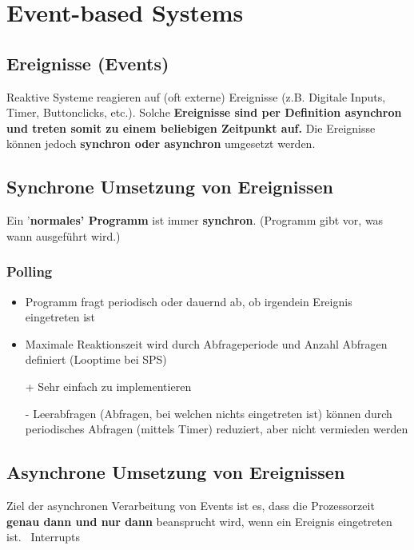 \section{Event-based Systems}

\subsection{Ereignisse (Events)}

Reaktive Systeme reagieren auf (oft externe) Ereignisse (z.B. Digitale Inputs, Timer, Buttonclicks, etc.). Solche \textbf{Ereignisse sind per 
Definition asynchron und treten somit zu einem beliebigen Zeitpunkt auf.} 
Die Ereignisse können jedoch \textbf{synchron oder asynchron} umgesetzt werden.


\subsection{Synchrone Umsetzung von Ereignissen}

Ein '\textbf{normales' Programm} ist immer \textbf{synchron}. (Programm gibt vor, was wann ausgeführt wird.)

\subsubsection{Polling}

\begin{itemize}
    \item Programm fragt periodisch oder dauernd ab, ob irgendein Ereignis eingetreten ist
    \item Maximale Reaktionszeit wird durch Abfrageperiode und Anzahl Abfragen definiert (Looptime bei SPS)
    \item[+] Sehr einfach zu implementieren
    \item[-] Leerabfragen (Abfragen, bei welchen nichts eingetreten ist) können durch periodisches Abfragen (mittels Timer) reduziert, 
        aber nicht vermieden werden
\end{itemize}


\subsection{Asynchrone Umsetzung von Ereignissen}

Ziel der asynchronen Verarbeitung von Events ist es, dass die Prozessorzeit \textbf{genau dann und nur dann} beansprucht wird, wenn ein 
Ereignis eingetreten ist. \textrightarrow\ Interrupts


